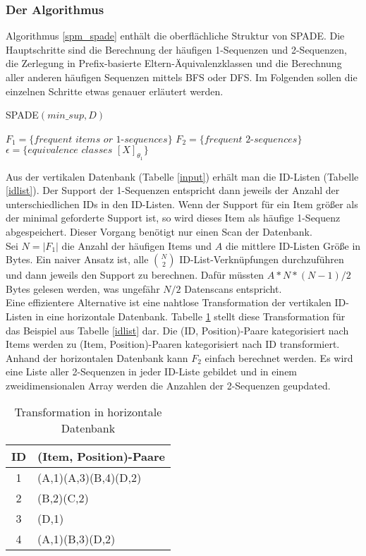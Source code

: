 \subsubsection*{Der Algorithmus}
Algorithmus \ref{spm_spade} enthält die oberflächliche Struktur von SPADE. Die Hauptschritte sind die Berechnung der häufigen 1-Sequenzen und 2-Sequenzen, die Zerlegung in Prefix-basierte Eltern-Äquivalenzklassen und die Berechnung aller anderen häufigen Sequenzen mittels BFS oder DFS. Im Folgenden sollen die einzelnen Schritte etwas genauer erläutert werden.\\
\begin{algorithm}
\caption{SPADE$(min\_ sup,D)$}\label{spm_spade}
\label{spadealg}
\begin{algorithmic}
\STATE $F_1 = \{ \textit{frequent items or 1-sequences} \}$
\STATE $F_2 = \{ \textit{frequent 2-sequences} \}$
\STATE $\epsilon = \{ \textit{equivalence classes } [X]_{\theta_1} \}$
  \ENDFOR
\end{algorithmic}
\end{algorithm}
Aus der vertikalen Datenbank (Tabelle \ref{input}) erhält man die ID-Listen (Tabelle \ref{idlist}). Der Support der 1-Sequenzen entspricht dann
jeweils der Anzahl der unterschiedlichen IDs in den ID-Listen. Wenn der Support für ein Item größer als der minimal geforderte Support ist, so wird dieses Item als häufige 1-Sequenz abgespeichert. Dieser Vorgang benötigt nur einen Scan der Datenbank.\\
Sei $N=|F_1|$ die Anzahl der häufigen Items und $A$ die mittlere ID-Listen Größe in Bytes. Ein naiver Ansatz ist, alle $\binom{N}{2}$ ID-List-Verknüpfungen durchzuführen und dann jeweils den Support zu berechnen. Dafür müssten $A*N*(N-1)/2$ Bytes gelesen werden, was ungefähr $N/2$ Datenscans entspricht.\\
Eine effizientere Alternative ist eine nahtlose Transformation der vertikalen ID-Listen in eine horizontale Datenbank. Tabelle \ref{hor} stellt diese Transformation für das Beispiel aus Tabelle \ref{idlist} dar. Die (ID, Position)-Paare kategorisiert nach Items werden zu (Item, Position)-Paaren kategorisiert nach ID transformiert. Anhand der horizontalen Datenbank kann $F_2$ einfach berechnet werden. Es wird eine Liste aller 2-Sequenzen in jeder ID-Liste gebildet und in einem zweidimensionalen Array werden die Anzahlen der 2-Sequenzen geupdated.\\
\begin{table}[H]
\centering
\begin{tabular}{c|l}
ID & (Item, Position)-Paare \\ \hline
1  & (A,1)(A,3)(B,4)(D,2) \\
2  & (B,2)(C,2) \\
3  & (D,1) \\
4  & (A,1)(B,3)(D,2)
\end{tabular}
\caption{Transformation in horizontale Datenbank}\label{hor}
\end{table}
